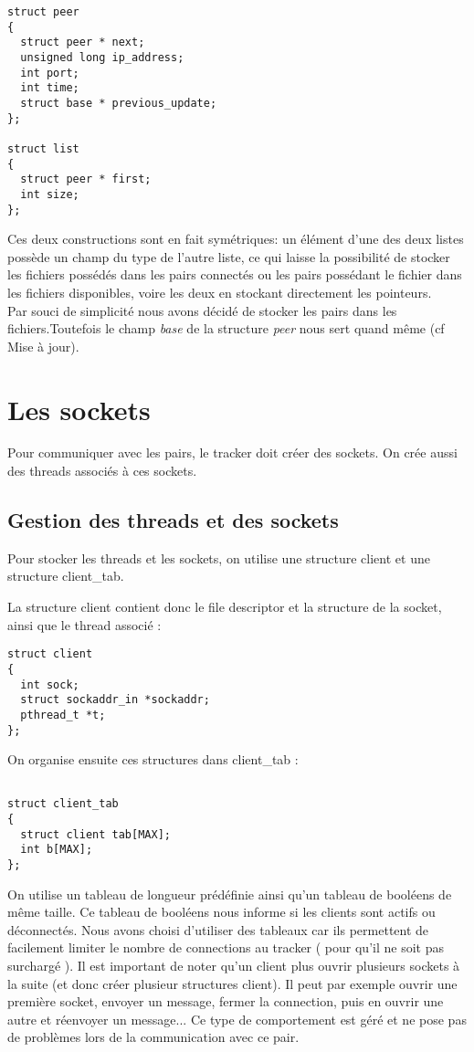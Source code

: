 \begin{verbatim}
struct peer
{
  struct peer * next;
  unsigned long ip_address;
  int port;
  int time;
  struct base * previous_update;
};

struct list
{
  struct peer * first;
  int size;
};
\end{verbatim}

Ces deux constructions sont en fait symétriques: un élément d'une des deux listes possède un champ du type de l'autre liste, ce qui laisse la possibilité de stocker les fichiers possédés dans les pairs connectés ou les pairs possédant le fichier dans les fichiers disponibles, voire les deux en stockant directement les pointeurs.\\ 
Par souci de simplicité nous avons décidé de stocker les pairs dans les fichiers.Toutefois le champ \textit{base} de la structure \textit{peer} nous sert quand même (cf Mise à jour).


\section{Les sockets}

Pour communiquer avec les pairs, le tracker doit créer des sockets. On crée aussi des threads associés à ces sockets.
\subsection{Gestion des threads et des sockets}
Pour stocker les threads et les sockets, on utilise une structure client et une structure client\_tab.

La structure client contient donc le file descriptor et la structure de la socket, ainsi que le thread associé :
\begin{verbatim}
struct client
{
  int sock;
  struct sockaddr_in *sockaddr;
  pthread_t *t; 
};
\end{verbatim}
On organise ensuite ces structures dans client\_tab :
\begin{verbatim}

struct client_tab
{
  struct client tab[MAX];
  int b[MAX];
};
\end{verbatim}
On utilise un tableau de longueur prédéfinie ainsi qu'un tableau de booléens de même taille. Ce tableau de booléens nous informe si les clients sont actifs ou déconnectés.
Nous avons choisi d'utiliser des tableaux car ils permettent de facilement limiter le nombre de connections au tracker ( pour qu'il ne soit pas surchargé ). Il est important de noter qu'un client plus ouvrir plusieurs sockets à la suite (et donc créer plusieur structures client). Il peut par exemple ouvrir une première socket, envoyer un message, fermer la connection, puis en ouvrir une autre et réenvoyer un message... Ce type de comportement est géré et ne pose pas de problèmes lors de la communication avec ce pair.


